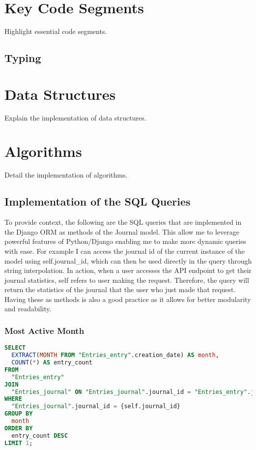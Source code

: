 \section{Key Code Segments}
Highlight essential code segments. 
\subsection{Typing}


\section{Data Structures}
Explain the implementation of data structures.

\section{Algorithms}
Detail the implementation of algorithms.

\subsection{Implementation of the SQL Queries}
To provide context, the following are the SQL queries that are implemented in the Django ORM as methods of the Journal model. This allow me to leverage powerful features of Python/Django enabling me to make more dynamic queries with ease. For example I can access the journal id of the current instance of the model using self.journal\_id, which can then be used directly in the query through string interpolation. In action, when a user accesses the API endpoint to get their journal statistics, self refers to user making the request. Therefore, the query will return the statistics of the journal that the user who just made that request. Having these as methods is also a good practice as it allows for better modularity and readability.


\subsubsection{Most Active Month}
\begin{lstlisting}[language=SQL]
SELECT
  EXTRACT(MONTH FROM "Entries_entry".creation_date) AS month,
  COUNT(*) AS entry_count
FROM
  "Entries_entry"
JOIN
  "Entries_journal" ON "Entries_journal".journal_id = "Entries_entry".journal_id_id
WHERE
  "Entries_journal".journal_id = {self.journal_id}
GROUP BY
  month
ORDER BY
  entry_count DESC
LIMIT 1;
\end{lstlisting}


